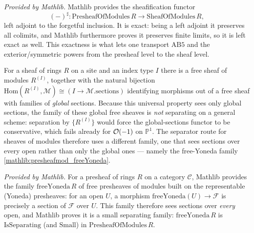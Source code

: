 \begin{lemma}
  \label{mathlib:sheafification_modules_exact}
  \mathlibok
  \textit{Provided by Mathlib.}
  Mathlib provides the sheafification functor
  \[
    (-)^{\sharp}:\mathrm{PresheafOfModules}\,R\to\mathrm{SheafOfModules}\,R ,
  \]
  left adjoint to the forgetful inclusion.  It is exact: being a left adjoint it
  preserves all colimits, and Mathlib furthermore proves it preserves finite
  limits, so it is left exact as well.  This exactness is what lets one transport \(\mathrm{AB5}\) and
  the exterior/symmetric powers from the presheaf level to the sheaf level.
\end{lemma}

\begin{remark}
  For a sheaf of rings \(R\) on a site and an index type \(I\) there is a free
  sheaf of modules \(R^{(I)}\), together with the natural bijection
  \(\mathrm{Hom}(R^{(I)},\mathcal M)\cong (I\to\mathcal M.\mathrm{sections})\)
  identifying morphisms out of a free sheaf with families of \emph{global}
  sections.  Because this universal property sees only global sections, the family
  of these global free sheaves is \emph{not} separating on a general scheme:
  separation by \(\{R^{(I)}\}\) would force the global-sections functor to be
  conservative, which fails already for \(\mathcal{O}(-1)\) on \(\mathbb P^1\).  The
  separator route for sheaves of modules therefore uses a different family, one
  that sees sections over every open rather than only the global ones --- namely
  the free-Yoneda family \cref{mathlib:presheafmod_freeYoneda}.
\end{remark}

\begin{lemma}
  \label{mathlib:presheafmod_freeYoneda}
  \mathlibok
  \textit{Provided by Mathlib.}
  For a presheaf of rings \(R\) on a category \(\mathcal C\), Mathlib provides the
  family \(\mathrm{freeYoneda}\,R\) of free presheaves of modules built on the
  representable (Yoneda) presheaves: for an open \(U\), a morphism
  \(\mathrm{freeYoneda}(U)\to\mathcal F\) is precisely a section of \(\mathcal F\)
  over \(U\).  This family therefore sees sections over \emph{every} open, and
  Mathlib proves it is a small separating family:
  \(\mathrm{freeYoneda}\,R\) is \(\mathrm{IsSeparating}\) (and \(\mathrm{Small}\))
  in \(\mathrm{PresheafOfModules}\,R\).
\end{lemma}

